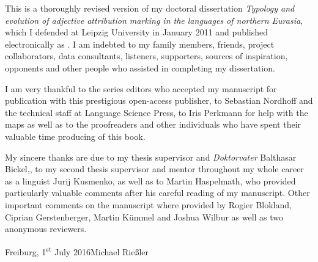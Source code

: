 

This is a thoroughly revised version of my doctoral dissertation \textit{Typology and evolution of adjective attribution marking in the languages of northern Eurasia}, which I defended at Leipzig University in January 2011 and published electronically as \citet{riesler2011a}. I am indebted to my family members, friends, project collaborators, data consultants, listeners, supporters, sources of inspiration, opponents and other people who assisted in completing my dissertation. 

I am very thankful to the series editors who accepted my manuscript for publication with this prestigious open-access publisher, to Sebastian Nordhoff and the technical staff at Language Science Press, to Iris Perkmann for help with the maps as well as to the proofreaders and other individuals who have spent their valuable time producing of this book. 

My sincere thanks are due to my thesis supervisor and \emph{Doktorvater} Balthasar Bickel,, to my second thesis supervisor and mentor throughout my whole career as a linguist Jurij Kusmenko, as well as to Martin Haspelmath, who provided particularly valuable comments after his careful reading of my manuscript. Other important comments on the manuscript where provided by Rogier Blokland, Ciprian Gerstenberger, Martin Kümmel and Joshua Wilbur as well as two anonymous reviewers.

\bigskip

\noindent
Freiburg, 1\textsuperscript{st} July 2016\hfill Michael Rießler
